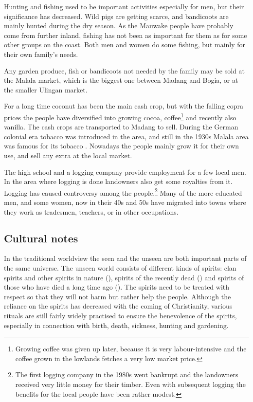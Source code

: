 Hunting and fishing used to be important activities especially for men, but their significance has decreased. Wild pigs are getting scarce, and bandicoots are mainly hunted during the dry season.  As the Mauwake people have probably come from further inland, fishing has not been as important for them as for some other groups on the coast.  Both men and women do some fishing, but mainly for their own family's needs. 

Any garden produce, fish or bandicoots not needed by the family may be sold at the Malala market, which is the biggest one between Madang and Bogia, or at the smaller Ulingan market.  

For a long time coconut has been the main cash crop, but with the falling copra prices the people have diversified into growing cocoa, coffee\footnote{Growing coffee was given up later, because it is very labour-intensive and the  coffee grown in the lowlands fetches a very low market price.} and recently also vanilla.  The cash crops are transported to Madang to sell.  During the German colonial era tobacco was introduced in the area, and still in the 1930s Malala area was famous for its tobacco \citep[454]{Tranel1952}. Nowadays the people mainly grow it for their own use, and sell any extra at the local market.

The high school and a logging company provide employment for a few local men.  In the area where logging is done landowners also get some royalties from it.  Logging has caused controversy among the people.\footnote{The first logging company in the 1980s went bankrupt and the landowners received very little money for their timber.  Even with subsequent logging the benefits for the local people have been rather modest.} Many of the more educated men, and some women, now in their 40s and 50s have migrated into towns where they work as tradesmen, teachers, or in other occupations. 

\subsection{Cultural notes} 
In the traditional worldview the seen and the unseen are both important parts of the same universe.  The unseen world consists of different kinds of spirits: clan spirits and other spirits in nature (), spirits of the recently dead () and spirits of those who have died a long time ago (). The spirits need to be treated with respect so that they will not harm but rather help the people.  Although the reliance on the spirits has decreased with the coming of Christianity, various rituals are still fairly widely practised to ensure the benevolence of the spirits, especially in connection with birth, death, sickness, hunting and gardening. 

